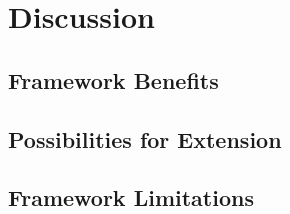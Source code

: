 
\chapter{Discussion\label{chap:discussion}}

\todo{}

\section{Framework Benefits}

\todo{}

\section{Possibilities for Extension}

\todo{}

\section{Framework Limitations}

\todo{}